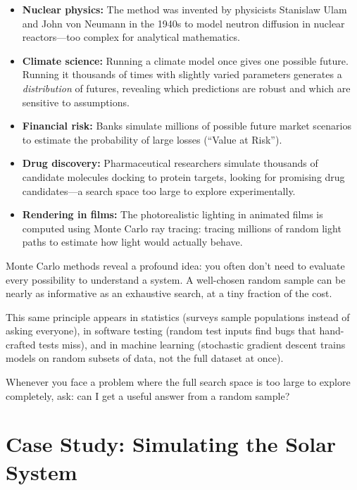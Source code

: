 \documentclass[11pt,letterpaper]{article}
\begin{document}
\begin{itemize}[itemsep=4pt]
    \item \textbf{Nuclear physics:} The method was invented by physicists Stanislaw Ulam and John von Neumann in the 1940s to model neutron diffusion in nuclear reactors---too complex for analytical mathematics.

    \item \textbf{Climate science:} Running a climate model once gives one possible future. Running it thousands of times with slightly varied parameters generates a \textit{distribution} of futures, revealing which predictions are robust and which are sensitive to assumptions.

    \item \textbf{Financial risk:} Banks simulate millions of possible future market scenarios to estimate the probability of large losses (``Value at Risk'').

    \item \textbf{Drug discovery:} Pharmaceutical researchers simulate thousands of candidate molecules docking to protein targets, looking for promising drug candidates---a search space too large to explore experimentally.

    \item \textbf{Rendering in films:} The photorealistic lighting in animated films is computed using Monte Carlo ray tracing: tracing millions of random light paths to estimate how light would actually behave.
\end{itemize}

\begin{tipbox}
Monte Carlo methods reveal a profound idea: you often don't need to evaluate every possibility to understand a system. A well-chosen random sample can be nearly as informative as an exhaustive search, at a tiny fraction of the cost.

This same principle appears in statistics (surveys sample populations instead of asking everyone), in software testing (random test inputs find bugs that hand-crafted tests miss), and in machine learning (stochastic gradient descent trains models on random subsets of data, not the full dataset at once).

Whenever you face a problem where the full search space is too large to explore completely, ask: can I get a useful answer from a random sample?
\end{tipbox}

\section{Case Study: Simulating the Solar System}
\end{document}
